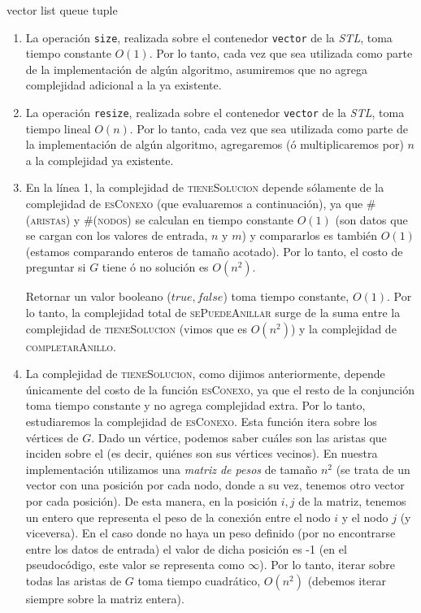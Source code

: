 vector
list
queue
tuple

\begin{enumerate}
  \item La operación \verb|size|, realizada sobre el contenedor \verb|vector| de la
  \textit{STL}, toma tiempo constante $O(1)$. Por lo tanto, cada vez que sea utilizada
  como parte de la implementación de algún algoritmo, asumiremos que no agrega complejidad
  adicional a la ya existente.

  \item La operación \verb|resize|, realizada sobre el contenedor \verb|vector| de la
  \textit{STL}, toma tiempo lineal $O(n)$. Por lo tanto, cada vez que sea utilizada
  como parte de la implementación de algún algoritmo, agregaremos (ó multiplicaremos por)
  $n$ a la complejidad ya existente.

  \item En la línea 1, la complejidad de \textsc{tieneSolucion} depende sólamente de
  la complejidad de \textsc{esConexo} (que evaluaremos a continuación), ya que
  \textsc{\#(aristas)} y \textsc{\#(nodos)} se calculan en tiempo constante $O(1)$
  (son datos que se cargan con los valores de entrada, $n$ y $m$) y compararlos es
  también $O(1)$ (estamos comparando enteros de tamaño acotado).
  Por lo tanto, el costo de preguntar si $G$ tiene ó no solución es $O(n^2)$.

  Retornar un valor booleano ($true, false$) toma tiempo constante, $O(1)$. Por lo tanto,
  la complejidad total de \textsc{sePuedeAnillar} surge de la suma entre la complejidad de
  \textsc{tieneSolucion} (vimos que es $O(n^2)$) y la complejidad de \textsc{completarAnillo}.

  \item La complejidad de \textsc{tieneSolucion}, como dijimos anteriormente, depende
  únicamente del costo de la función \textsc{esConexo}, ya que el resto de la conjunción
  toma tiempo constante y no agrega complejidad extra. Por lo tanto, estudiaremos la
  complejidad de \textsc{esConexo}. Esta función itera sobre los vértices de $G$.
  Dado un vértice, podemos saber cuáles son las aristas que inciden sobre el (es decir,
  quiénes son sus vértices vecinos). En nuestra implementación utilizamos una \textit{matriz de
  pesos} de tamaño $n^2$ (se trata de un vector con una posición por cada nodo, donde a su vez,
  tenemos otro vector por cada posición). De esta manera, en la posición $i,j$ de la matriz,
  tenemos un entero que representa el peso de la conexión entre el nodo $i$ y el nodo $j$ (y viceversa).
  En el caso donde no haya un peso definido (por no encontrarse entre los datos de entrada) el valor
  de dicha posición es -1 (en el pseudocódigo, este valor se representa como $\infty$).
  Por lo tanto, iterar sobre todas las aristas de $G$ toma tiempo
  cuadrático, $O(n^2)$ (debemos iterar siempre sobre la matriz entera).


\end{enumerate}
